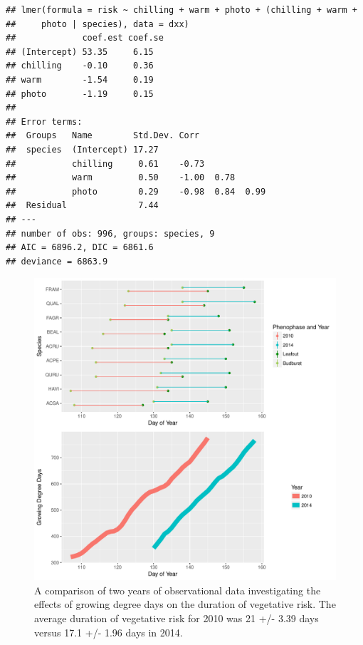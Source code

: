 \documentclass{article}\usepackage[]{graphicx}\usepackage[]{color}
\makeatletter
\newenvironment{kframe}{%
 \def\at@end@of@kframe{}%
 \ifinner\ifhmode%
  \def\at@end@of@kframe{\end{minipage}}%
  \begin{minipage}{\columnwidth}%
 \fi\fi%
 \def\FrameCommand##1{\hskip\@totalleftmargin \hskip-\fboxsep
 \colorbox{shadecolor}{##1}\hskip-\fboxsep
     \hskip-\linewidth \hskip-\@totalleftmargin \hskip\columnwidth}%
 \MakeFramed {\advance\hsize-\width
   \@totalleftmargin\z@ \linewidth\hsize
   \@setminipage}}%
 {\par\unskip\endMakeFramed%
 \at@end@of@kframe}
\newenvironment{knitrout}{}{} %
\makeatother
\begin{document}
\begin{knitrout}
\color{fgcolor}\begin{kframe}
\begin{verbatim}
## lmer(formula = risk ~ chilling + warm + photo + (chilling + warm + 
##     photo | species), data = dxx)
##             coef.est coef.se
## (Intercept) 53.35     6.15  
## chilling    -0.10     0.36  
## warm        -1.54     0.19  
## photo       -1.19     0.15  
## 
## Error terms:
##  Groups   Name        Std.Dev. Corr              
##  species  (Intercept) 17.27                      
##           chilling     0.61    -0.73             
##           warm         0.50    -1.00  0.78       
##           photo        0.29    -0.98  0.84  0.99 
##  Residual              7.44                      
## ---
## number of obs: 996, groups: species, 9
## AIC = 6896.2, DIC = 6861.6
## deviance = 6863.9
\end{verbatim}
\end{kframe}
\end{knitrout}

\begin{figure} [H] 
\begin{center}
\includegraphics{..//figure/HF_gddTime.pdf}
\caption{A comparison of two years of observational data investigating the effects of growing degree days on the duration of vegetative risk. The average duration of vegetative risk for 2010 was 21 +/- 3.39 days versus 17.1 +/- 1.96 days in 2014.}\label{fig:forest}
\end{center}
\end{figure}
\end{document}
